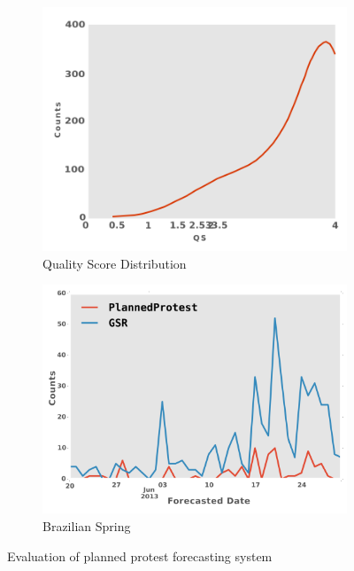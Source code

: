 \documentclass[letterpaper]{article}
\begin{document}
\begin{figure}
\begin{subfigure}{0.40\columnwidth}
    \centering
  \includegraphics[width=0.8\columnwidth]{doubleHump_new3}
  \caption{\scriptsize Quality Score Distribution}
  \label{fig:doubleHump}
\end{subfigure}\hspace{.5pt}
\begin{subfigure}{0.40\columnwidth}
    \centering
  \includegraphics[width=0.8\columnwidth]{brazil_june_new}
  \caption{\scriptsize Brazilian Spring}
  \label{fig:brazil_june}
\end{subfigure}
\caption{Evaluation of planned protest forecasting system}
\end{figure}%
\end{document}
